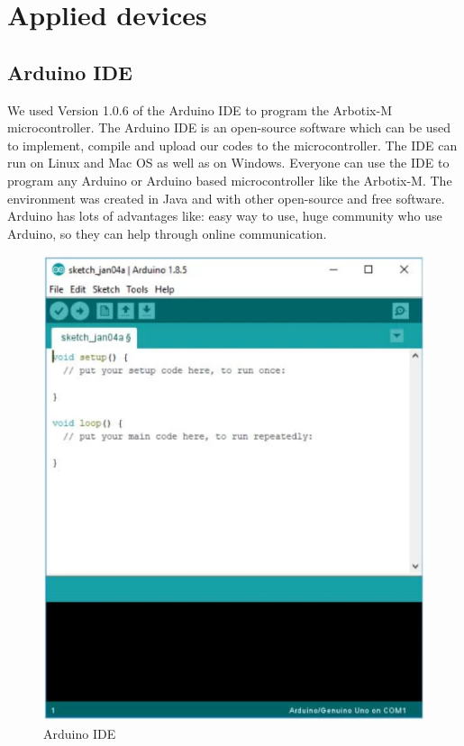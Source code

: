 
\chapter{Applied devices}


	\section{Arduino IDE}
	
		\hspace{15pt}We used Version 1.0.6 of the Arduino IDE to program the Arbotix-M microcontroller. The Arduino IDE is an open-source software which can be used to implement, compile and upload our codes to the microcontroller. The IDE can run on Linux and Mac OS as well as on Windows. Everyone can use the IDE to program any Arduino or Arduino based microcontroller like the Arbotix-M. The environment was created in Java and with other open-source and free software. Arduino has lots of advantages like: easy way to use, huge community who use Arduino, so they can help through online communication. \cite{arduino1} \cite{arduino2}
	
			\begin{figure}[ht]
				\centering
				\includegraphics[scale=0.65]{./images/arduino_ide}
				\caption{Arduino IDE \cite{arduino_ide}}
			\end{figure}
			
